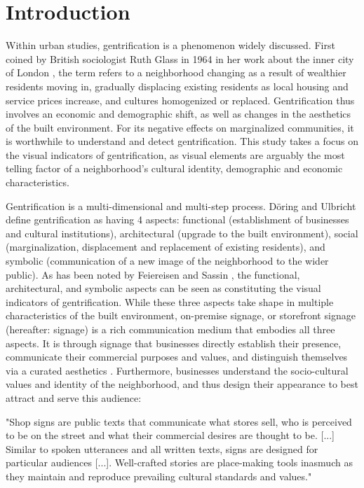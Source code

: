 \section{Introduction}
\label{sec:introduction}

Within urban studies, gentrification is a phenomenon widely discussed. First coined by British sociologist Ruth Glass in 1964 in her work about the inner city of London \cite{Glass1964}, the term refers to a neighborhood changing as a result of wealthier residents moving in, gradually displacing existing residents as local housing and service prices increase, and cultures homogenized or replaced. Gentrification thus involves an economic and demographic shift, as well as changes in the aesthetics of the built environment. For its negative effects on marginalized communities, it is worthwhile to understand and detect gentrification. This study takes a focus on the visual indicators of gentrification, as visual elements are arguably the most telling factor of a neighborhood’s cultural identity, demographic and economic characteristics.

Gentrification is a multi-dimensional and multi-step process. Döring and Ulbricht \cite{döring_ulbricht_2018} define gentrification as having 4 aspects: functional (establishment of businesses and cultural institutions), architectural (upgrade to the built environment), social (marginalization, displacement and replacement of existing residents), and symbolic (communication of a new image of the neighborhood to the wider public). As has been noted by Feiereisen and Sassin \cite{feiereisen_sounding_2021}, the functional, architectural, and symbolic aspects can be seen as constituting the visual indicators of gentrification. While these three aspects take shape in multiple characteristics of the built environment, on-premise signage, or storefront signage (hereafter: signage) is a rich communication medium that embodies all three aspects. It is through signage that businesses directly establish their presence, communicate their commercial purposes and values, and distinguish themselves via a curated aesthetics \cite{rahman_signage_2020}. Furthermore, businesses understand the socio-cultural values and identity of the neighborhood, and thus design their appearance to best attract and serve this audience:

\begin{displayquote}
    "Shop signs are public texts that communicate what stores sell, who is perceived to be on the street and what their commercial desires are thought to be. [...] Similar to spoken utterances and all written texts, signs are designed for particular audiences [...]. Well-crafted stories are place-making tools inasmuch as they maintain and reproduce prevailing cultural standards and values." \cite{trinch_signsays_2017}
\end{displayquote}

